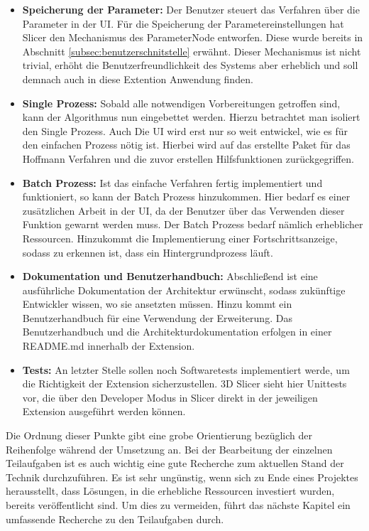 \begin{itemize}
	\item \textbf{Speicherung der Parameter:} Der Benutzer steuert das Verfahren
		über die Parameter in der UI. Für die Speicherung der Parametereinstellungen
		hat Slicer den Mechanismus des ParameterNode entworfen. Diese wurde bereits
		in Abschnitt \ref{subsec:benutzerschnitstelle} erwähnt. Dieser Mechanismus ist
		nicht trivial, erhöht die Benutzerfreundlichkeit des Systems aber erheblich
		und soll demnach auch in diese Extention Anwendung finden.

	\item \textbf{Single Prozess:} Sobald alle notwendigen Vorbereitungen
		getroffen sind, kann der Algorithmus nun eingebettet werden. Hierzu
		betrachtet man isoliert den Single Prozess. Auch Die UI wird erst nur so weit
		entwickel, wie es für den einfachen Prozess nötig ist. Hierbei wird auf das erstellte
		Paket für das Hoffmann Verfahren und die zuvor erstellen Hilfsfunktionen zurückgegriffen.

	\item \textbf{Batch Prozess:} Ist das einfache Verfahren fertig implementiert
		und funktioniert, so kann der Batch Prozess hinzukommen. Hier bedarf es
		einer zusätzlichen Arbeit in der UI, da der Benutzer über das Verwenden dieser
		Funktion gewarnt werden muss. Der Batch Prozess bedarf nämlich erheblicher
		Ressourcen. Hinzukommt die Implementierung einer Fortschrittsanzeige, sodass
		zu erkennen ist, dass ein Hintergrundprozess läuft.

	\item \textbf{Dokumentation und Benutzerhandbuch:} Abschließend ist eine
		ausführliche Dokumentation der Architektur erwünscht, sodass zukünftige Entwickler
		wissen, wo sie ansetzten müssen. Hinzu kommt ein Benutzerhandbuch für eine Verwendung
		der Erweiterung. Das Benutzerhandbuch und die Architekturdokumentation
		erfolgen in einer README.md innerhalb der Extension.

	\item \textbf{Tests:} An letzter Stelle sollen noch Softwaretests
		implementiert werde, um die Richtigkeit der Extension sicherzustellen. 3D
		Slicer sieht hier Unittests vor, die über den Developer Modus in Slicer direkt
		in der jeweiligen Extension ausgeführt werden können.
\end{itemize}

Die Ordnung dieser Punkte gibt eine grobe Orientierung bezüglich der Reihenfolge
während der Umsetzung an. Bei der Bearbeitung der einzelnen Teilaufgaben ist es auch
wichtig eine gute Recherche zum aktuellen Stand der Technik durchzuführen. Es
ist sehr ungünstig, wenn sich zu Ende eines Projektes herausstellt, dass
Lösungen, in die erhebliche Ressourcen investiert wurden, bereits veröffentlicht
sind. Um dies zu vermeiden, führt das nächste Kapitel ein umfassende Recherche
zu den Teilaufgaben durch.

